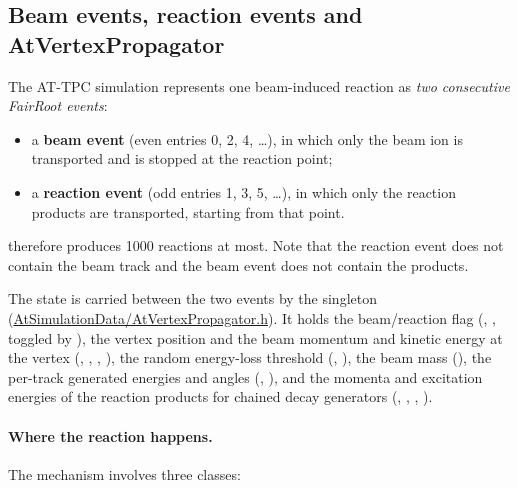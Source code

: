 \subsection{Beam events, reaction events and AtVertexPropagator}
\label{sec:sim:vertex}

The AT-TPC simulation represents one beam-induced reaction as \emph{two consecutive FairRoot
events}:

\begin{itemize}
  \item a \textbf{beam event} (even entries 0, 2, 4, \ldots), in which only the beam ion is
    transported and is stopped at the reaction point;
  \item a \textbf{reaction event} (odd entries 1, 3, 5, \ldots), in which only the reaction products
    are transported, starting from that point.
\end{itemize}

 therefore produces 1000 reactions at most. Note that the reaction event does
not contain the beam track and the beam event does not contain the products.

The state is carried between the two events by the singleton 
(\url{AtSimulationData/AtVertexPropagator.h}). It holds the beam/reaction flag
(, , toggled by ), the vertex position and
the beam momentum and kinetic energy at the vertex (, ,
, ), the random energy-loss threshold (,
), the beam mass (), the per-track generated energies and angles
(, ), and the momenta and excitation energies of the
reaction products for chained decay generators (, ,
, ).

\paragraph{Where the reaction happens.} The mechanism involves three classes:

